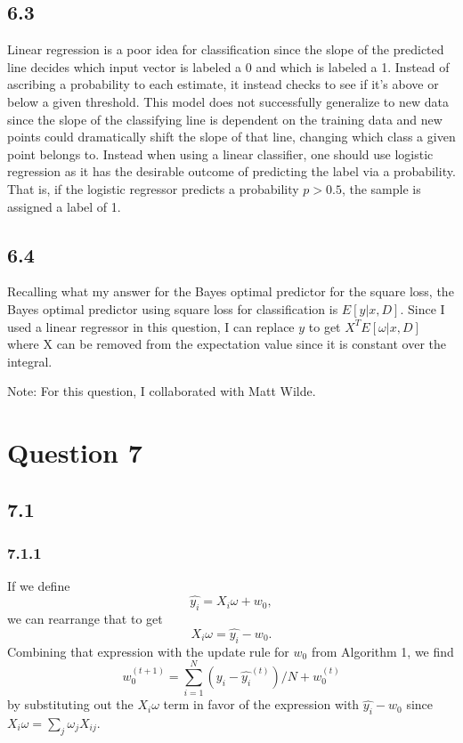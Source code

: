 \documentclass[12pt]{amsart}
\begin{document}
\subsection*{6.3}
Linear regression is a poor idea for classification since the slope of the predicted line decides which input vector is labeled a 0 and which is labeled a 1.  Instead of ascribing a probability to each estimate, it instead checks to see if it's above or below a given threshold.  This model does not successfully generalize to new data since the slope of the classifying line is dependent on the training data and new points could dramatically shift the slope of that line, changing which class a given point belongs to.  Instead when using a linear classifier, one should use logistic regression as it has the desirable outcome of predicting the label via a probability.  That is, if the logistic regressor predicts a probability $p > 0.5$, the sample is assigned a label of 1.

\subsection*{6.4}

Recalling what my answer for the Bayes optimal predictor for the square loss, the Bayes optimal predictor using square loss for classification is $E[y|x,D]$.  Since I used a linear regressor in this question, I can replace $y$ to get $X^TE[\omega|x,D]$ where X can be removed from the expectation value since it is constant over the integral.

Note: For this question, I collaborated with Matt Wilde.


\section*{Question 7}

\subsection*{7.1}

\subsubsection*{7.1.1}
If we define
\begin{equation}
\hat{y_i} = X_i \omega + w_0,
\end{equation}
we can rearrange that to get 
\begin{equation}
X_i \omega = \hat{y_i} - w_0.
\end{equation}
Combining that expression with the update rule for $w_0$ from Algorithm 1, we find
\begin{equation}
w_0^{(t+1)} = \sum_{i = 1}^N (y_i - \hat{y_i}^{(t)})/N + w_0^{(t)}
\end{equation}
by substituting out the $X_i \omega$ term in favor of the expression with $\hat{y_i} - w_0$ since $X_i \omega = \sum_j \omega_j X_{ij}$.
\end{document}
